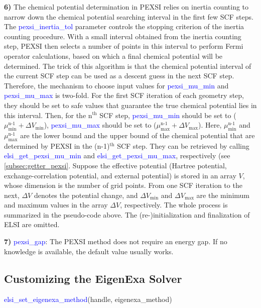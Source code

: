 \documentclass{report}
\newcommand{\tcb}[1]{\textcolor{blue}{#1}}
\begin{document}
\textbf{6)} The chemical potential determination in PEXSI relies on inertia counting to narrow down the chemical potential searching interval in the first few SCF steps. The \tcb{pexsi\_inertia\_tol} parameter controls the stopping criterion of the inertia counting procedure. With a small interval obtained from the inertia counting step, PEXSI then selects a number of points in this interval to perform Fermi operator calculations, based on which a final chemical potential will be determined. The trick of this algorithm is that the chemical potential interval of the current SCF step can be used as a descent guess in the next SCF step. Therefore, the mechanism to choose input values for \tcb{pexsi\_mu\_min} and \tcb{pexsi\_mu\_max} is two-fold. For the first SCF iteration of each geometry step, they should be set to safe values that guarantee the true chemical potential lies in this interval. Then, for the n$^\text{th}$ SCF step, \tcb{pexsi\_mu\_min} should be set to ($\mu_\text{min}^\text{n-1} + \Delta V_\text{min}$), \tcb{pexsi\_mu\_max} should be set to ($\mu_\text{max}^\text{n-1} + \Delta V_\text{max}$). Here, $\mu_\text{min}^\text{n-1}$ and $\mu_\text{max}^\text{n-1}$ are the lower bound and the upper bound of the chemical potential that are determined by PEXSI in the (n-1)$^\text{th}$ SCF step. They can be retrieved by calling \tcb{elsi\_get\_pexsi\_mu\_min} and \tcb{elsi\_get\_pexsi\_mu\_max}, respectively (see \ref{subsec:getter_pexsi}. Suppose the effective potential (Hartree potential, exchange-correlation potential, and external potential) is stored in an array $V$, whose dimension is the number of grid points. From one SCF iteration to the next, $\Delta V$ denotes the potential change, and $\Delta V_\text{min}$ and $\Delta V_\text{max}$ are the minimum and maximum values in the array $\Delta V$, respectively. The whole process is summarized in the pseudo-code above. The (re-)initialization and finalization of ELSI are omitted.

\textbf{7)} \tcb{pexsi\_gap}: The PEXSI method does not require an energy gap. If no knowledge is available, the default value usually works.

\subsection{Customizing the EigenExa Solver}
\label{subsec:setter_eigenexa}
\begin{labeling}{\hspace{6cm}}
\item [\hspace{0.3cm} \tcb{elsi\_set\_eigenexa\_method}(handle, eigenexa\_method)]
\end{labeling}
\end{document}
